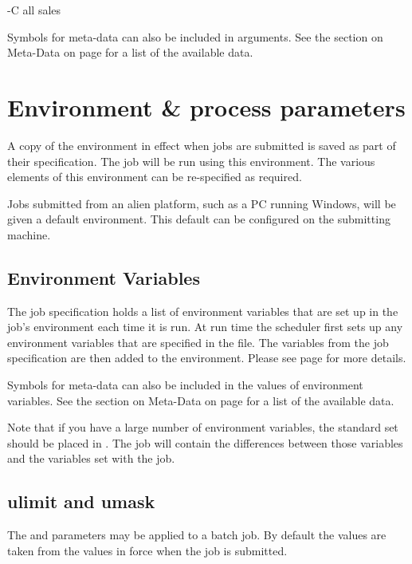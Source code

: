 \begin{expara}

{}-C\newline
all\newline
sales

\end{expara}

Symbols for meta-data can also be included in arguments. See the section
on Meta-Data on page \pageref{bkm:Metadata} for a list of the available data.

\section{Environment \& process parameters}
A copy of the environment in effect when jobs are submitted is saved as part of their specification. The job will be run using this
environment. The various elements of this environment can be re-specified as required.

Jobs submitted from an alien platform, such as a PC running Windows, will be given a default environment. This default can be configured on
the submitting machine.

\subsection{Environment Variables}
The job specification holds a list of environment variables that are set up in the job's environment each time it is run. At
run time the scheduler first sets up any environment variables that are specified in the \batchenv{} file. The
variables from the job specification are then added to the environment. Please see page \pageref{Staticenv} for more details.

Symbols for meta-data can also be included in the values of environment variables. See the section on Meta-Data on page \pageref{bkm:Metadata} for a list of the available data.

Note that if you have a large number of environment variables, the standard set should be placed in \batchenv{}.
The job will contain the differences between those variables and the variables set with the job.

\subsection{ulimit and umask}
The  and  parameters may be applied to a batch job. By default the values are
taken from the values in force when the job is submitted.

